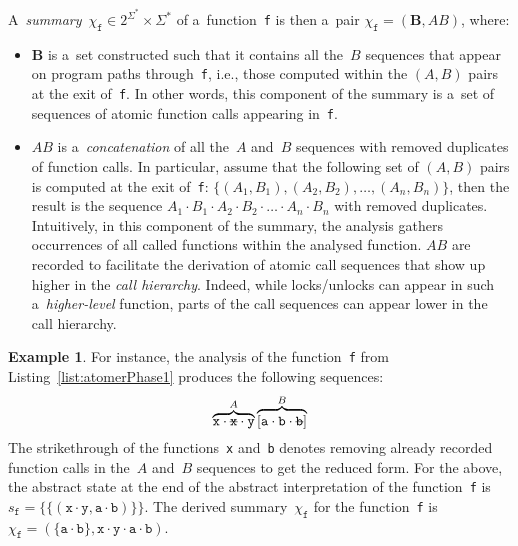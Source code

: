 \documentclass{ExcelAtFIT}
\theoremstyle{definition}
\newtheorem{example}{Example}[section]
\begin{document}
A~\emph{summary}~$ \chi_\mathtt{f} \in 2^{\Sigma^*} \times \Sigma^* $ of a~function~\texttt{f} is then a~pair $ \chi_\mathtt{f} = (\boldsymbol{B}, AB) $, where:
\begin{itemize}
    \item $ \boldsymbol{B} $ is a~set constructed such that it contains all the~$ B $ sequences that appear on program paths through~\texttt{f}, i.e., those computed within the ${ (A, B) }$ pairs at the exit of~\texttt{f}. In other words, this component of the summary is a~set of sequences of atomic function calls appearing in~\texttt{f}.

    \item $ AB $ is a~\emph{concatenation} of all the~$ A $ and~$ B $ sequences with removed duplicates of function calls. In particular, assume that the following set of ${ (A, B) }$ pairs is computed at the exit of~\texttt{f}: $ \{{(A_1, B_1)}, {(A_2, B_2)}, \ldots, {(A_n, B_n)}\} $, then the result is the sequence $ A_1 \cdot B_1 \cdot A_2 \cdot B_2 \cdot \ldots \cdot A_n \cdot B_n $ with removed duplicates. Intuitively, in this component of the summary, the analysis gathers occurrences of all called functions within the analysed function. $ AB $ are recorded to facilitate the derivation of atomic call sequences that show up higher in the \emph{call hierarchy}. Indeed, while locks/unlocks can appear in such a~\emph{higher-level} function, parts of the call sequences can appear lower in the call hierarchy.
\end{itemize}

\vspace{-.5em}
\begin{example}
    For instance, the analysis of the function~\texttt{f} from Listing~\ref{list:atomerPhase1} produces the following sequences:
    $$
        \overbrace{\mathtt{x} \cdot \text{\texttt{\sout{x}}} \cdot \mathtt{y}}^A \overbrace{[\mathtt{a} \cdot \mathtt{b} \cdot \text{\texttt{\sout{b}}}]}^B
    $$
    The strikethrough of the functions~\texttt{x} and~\texttt{b} denotes removing already recorded function calls in the~$ A $ and~$ B $ sequences to get the reduced form. For the above, the abstract state at the end of the abstract interpretation of the function~\texttt{f} is $ s_\mathtt{f} = \{\{(\mathtt{x} \cdot \mathtt{y}, \mathtt{a} \cdot \mathtt{b})\}\} $. The derived summary~$ \chi_\mathtt{f} $ for the function~\texttt{f} is $ \chi_\mathtt{f} = {(\{{\mathtt{a} \cdot \mathtt{b}}\}, {\mathtt{x} \cdot \mathtt{y} \cdot \mathtt{a} \cdot \mathtt{b}})} $.
\end{example}
\end{document}
